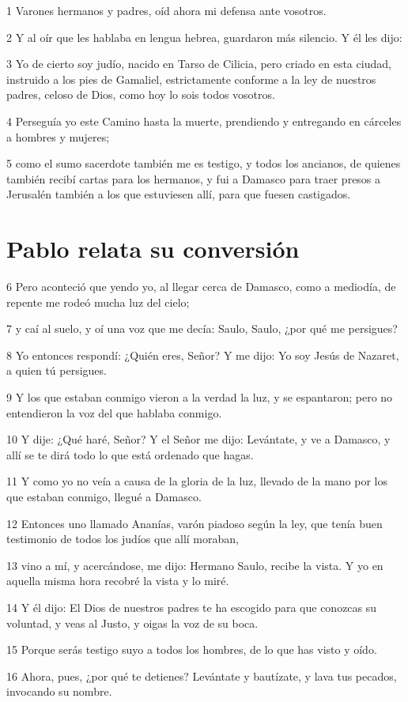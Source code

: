\par 1 Varones hermanos y padres, oíd ahora mi defensa ante vosotros.
\par 2 Y al oír que les hablaba en lengua hebrea, guardaron más silencio. Y él les dijo:
\par 3 Yo de cierto soy judío, nacido en Tarso de Cilicia, pero criado en esta ciudad, instruido a los pies de Gamaliel, estrictamente conforme a la ley de nuestros padres, celoso de Dios, como hoy lo sois todos vosotros.
\par 4 Perseguía yo este Camino hasta la muerte, prendiendo y entregando en cárceles a hombres y mujeres;
\par 5 como el sumo sacerdote también me es testigo, y todos los ancianos, de quienes también recibí cartas para los hermanos, y fui a Damasco para traer presos a Jerusalén también a los que estuviesen allí, para que fuesen castigados.

\section*{Pablo relata su conversión}

\par 6 Pero aconteció que yendo yo, al llegar cerca de Damasco, como a mediodía, de repente me rodeó mucha luz del cielo;
\par 7 y caí al suelo, y oí una voz que me decía: Saulo, Saulo, ¿por qué me persigues?
\par 8 Yo entonces respondí: ¿Quién eres, Señor? Y me dijo: Yo soy Jesús de Nazaret, a quien tú persigues.
\par 9 Y los que estaban conmigo vieron a la verdad la luz, y se espantaron; pero no entendieron la voz del que hablaba conmigo.
\par 10 Y dije: ¿Qué haré, Señor? Y el Señor me dijo: Levántate, y ve a Damasco, y allí se te dirá todo lo que está ordenado que hagas.
\par 11 Y como yo no veía a causa de la gloria de la luz, llevado de la mano por los que estaban conmigo, llegué a Damasco.
\par 12 Entonces uno llamado Ananías, varón piadoso según la ley, que tenía buen testimonio de todos los judíos que allí moraban,
\par 13 vino a mí, y acercándose, me dijo: Hermano Saulo, recibe la vista. Y yo en aquella misma hora recobré la vista y lo miré.
\par 14 Y él dijo: El Dios de nuestros padres te ha escogido para que conozcas su voluntad, y veas al Justo, y oigas la voz de su boca.
\par 15 Porque serás testigo suyo a todos los hombres, de lo que has visto y oído.
\par 16 Ahora, pues, ¿por qué te detienes? Levántate y bautízate, y lava tus pecados, invocando su nombre.

